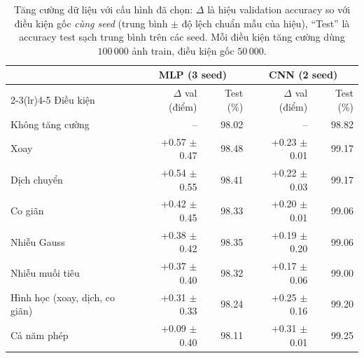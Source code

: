 \begin{table}[H]\centering\small
\begin{tabular}{lrrrr}
\toprule
 & \multicolumn{2}{c}{MLP (3 seed)} & \multicolumn{2}{c}{CNN (2 seed)} \\
\cmidrule(lr){2-3}\cmidrule(lr){4-5}
Điều kiện & $\Delta$ val (điểm) & Test (\%) & $\Delta$ val (điểm) & Test (\%) \\
\midrule
Không tăng cường & -- & 98.02 & -- & 98.82 \\
Xoay & +0.57 $\pm$ 0.47 & 98.48 & +0.23 $\pm$ 0.01 & 99.17 \\
Dịch chuyển & +0.54 $\pm$ 0.55 & 98.41 & +0.22 $\pm$ 0.03 & 99.17 \\
Co giãn & +0.42 $\pm$ 0.45 & 98.33 & +0.20 $\pm$ 0.01 & 99.06 \\
Nhiễu Gauss & +0.38 $\pm$ 0.42 & 98.35 & +0.19 $\pm$ 0.20 & 99.06 \\
Nhiễu muối tiêu & +0.37 $\pm$ 0.40 & 98.32 & +0.17 $\pm$ 0.06 & 99.00 \\
Hình học (xoay, dịch, co giãn) & +0.31 $\pm$ 0.33 & 98.24 & +0.25 $\pm$ 0.16 & 99.20 \\
Cả năm phép & +0.09 $\pm$ 0.40 & 98.11 & +0.31 $\pm$ 0.01 & 99.25 \\
\bottomrule
\end{tabular}
\caption{Tăng cường dữ liệu với cấu hình đã chọn: $\Delta$ là hiệu validation accuracy so với điều kiện gốc \emph{cùng seed} (trung bình $\pm$ độ lệch chuẩn mẫu của hiệu), ``Test'' là accuracy test sạch trung bình trên các seed. Mỗi điều kiện tăng cường dùng $100\,000$ ảnh train, điều kiện gốc $50\,000$.}
\label{tab:augmentation}
\end{table}
